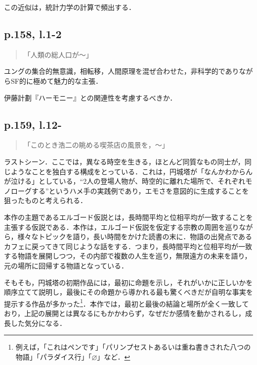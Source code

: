 \documentclass[10pt, a5paper, twoside]{jsarticle}
\theoremstyle{definition}
\begin{document}
			この近似は，統計力学の計算で頻出する．

		\subsection{p.158, l.1-2}

			\begin{quote}
				
				「人類の総人口が〜」

			\end{quote}

			ユングの集合的無意識，相転移，人間原理を混ぜ合わせた，非科学的でありながらSF的に極めて魅力的な主張．

			伊藤計劃『ハーモニー』との関連性を考慮するべきか．

		\subsection{p.159, l.12-}

			\begin{quote}
				
				「このとき浩二の眺める喫茶店の風景を，〜」

			\end{quote}

			ラストシーン．ここでは，異なる時空を生きる，ほとんど同質なもの同士が，同じようなことを独白する構成をとっている．これは，円城塔が「なんかわからんが泣ける」としている，“2人の登場人物が、時空的に離れた場所で、それぞれモノローグする”というハメ手\cite{tki}の実践例であり，エモさを意図的に生成することを狙ったものと考えられる．

			本作の主題であるエルゴード仮説とは，長時間平均と位相平均が一致することを主張する仮説である．本作は，エルゴード仮説を仮定する宗教の周囲を巡りながら，様々なトピックを語り，長い時間をかけた読書の末に．物語の出発点であるカフェに戻ってきて同じような話をする．つまり，長時間平均と位相平均が一致する物語を展開しつつ，その内部で複数の人生を巡り，無限遠方の未来を語り，元の場所に回帰する物語となっている．

			そもそも，円城塔の初期作品には，最初に命題を示し，それがいかに正しいかを順序立てて説明し，最後にその命題から導かれる最も驚くべきだが自明な事実を提示する作品が多かった\footnote{例えば，「これはペンです」「パリンプセストあるいは重ね書きされた八つの物語」「パラダイス行」「$\varnothing$」など．}．本作では，最初と最後の結論と場所が全く一致しており，上記の展開とは異なるにもかかわらず，なぜだか感情を動かされるし，成長した気分になる．
\end{document}
